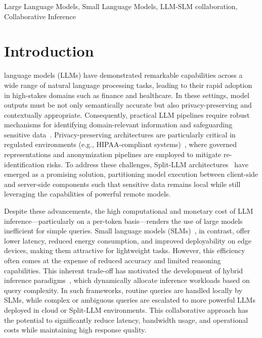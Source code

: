\documentclass[lettersize,journal]{IEEEtran}
\begin{document}
\begin{IEEEkeywords}
    Large Language Models, Small Language Models, LLM-SLM collaboration, Collaborative Inference
\end{IEEEkeywords}

\section{Introduction}
 language models (LLMs) have demonstrated remarkable capabilities across a wide range of natural language processing tasks, leading to their rapid adoption in high-stakes domains such as finance and healthcare. In these settings, model outputs must be not only semantically accurate but also privacy-preserving and contextually appropriate. Consequently, practical LLM pipelines require robust mechanisms for identifying domain-relevant information and safeguarding sensitive data~\cite{Zhang2025,He2025}. Privacy-preserving architectures are particularly critical in regulated environments (e.g., HIPAA-compliant systems)~\cite{Ostrovskiy2025}, where governed representations and anonymization pipelines are employed to mitigate re-identification risks. To address these challenges, Split-LLM architectures~\cite{Pham2025,Hukkeri2025,Alhindi2025} have emerged as a promising solution, partitioning model execution between client-side and server-side components such that sensitive data remains local while still leveraging the capabilities of powerful remote models.

Despite these advancements, the high computational and monetary cost of LLM inference—particularly on a per-token basis—renders the use of large models inefficient for simple queries. Small language models (SLMs)~\cite{slm1, slm2}, in contrast, offer lower latency, reduced energy consumption, and improved deployability on edge devices, making them attractive for lightweight tasks. However, this efficiency often comes at the expense of reduced accuracy and limited reasoning capabilities. This inherent trade-off has motivated the development of hybrid inference paradigms~\cite{WZheng2025,CZheng2026,Xu2026,Luo2026,Wang2026,Song2025,Ong2025,Tran2025}, which dynamically allocate inference workloads based on query complexity. In such frameworks, routine queries are handled locally by SLMs, while complex or ambiguous queries are escalated to more powerful LLMs deployed in cloud or Split-LLM environments. This collaborative approach has the potential to significantly reduce latency, bandwidth usage, and operational costs while maintaining high response quality.
\end{document}
